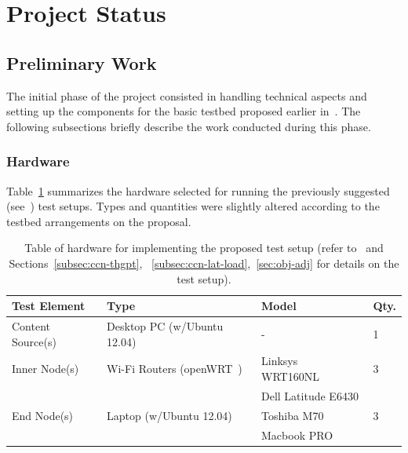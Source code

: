 \section{Project Status}
\label{sec:pro-stat}

\subsection{Preliminary Work}
\label{subsec:pre-work}

The initial phase of the project consisted in handling technical aspects and 
setting up the components for the basic testbed proposed earlier 
in~\cite{Rodrigues2013b}. The following subsections briefly describe the work 
conducted during this phase.

\subsubsection{Hardware}
\label{subsubsec:hardware}

Table~\ref{tab:hw} summarizes the hardware selected for running the previously 
suggested (see~\cite{Rodrigues2013b}) test setups. Types and quantities were 
slightly altered according to the testbed arrangements on the proposal.

\begin{table}[h!]
    \centering
    \footnotesize
        \begin{tabularx}{0.75\textwidth}{ l l l X }
            \toprule
            \textbf{Test Element}           & \textbf{Type}                     & \textbf{Model}            & \textbf{Qty.} \\ [0.5ex]
            \midrule
            Content Source(s)               & Desktop PC (w\slash Ubuntu 12.04) & -                         & 1 \\ [0.5ex]
            \midrule
            Inner Node(s)                   & Wi-Fi Routers (openWRT~\cite{website:openwrt})   & Linksys WRT160NL~\cite{website:wrt160nl}  & 3 \\ [0.5ex]
            \midrule
            \multirow{3}{*}{End Node(s)}    & \multirow{3}{*}{Laptop (w\slash Ubuntu 12.04)}    & Dell Latitude E6430   & \multirow{3}{*}{3} \\ [0.5ex]
                                            &                                                   & Toshiba M70           & \\ [0.5ex]
                                            &                                                   & Macbook PRO           & \\ [0.5ex]
            \bottomrule
        \end{tabularx}
    \caption{Table of hardware for implementing the proposed test setup (refer 
        to~\cite{Rodrigues2013b} and Sections~\ref{subsec:ccn-thgpt},
        ~\ref{subsec:ccn-lat-load},~\ref{sec:obj-adj} for details on the 
        test setup).}
    \label{tab:hw}
\end{table}


